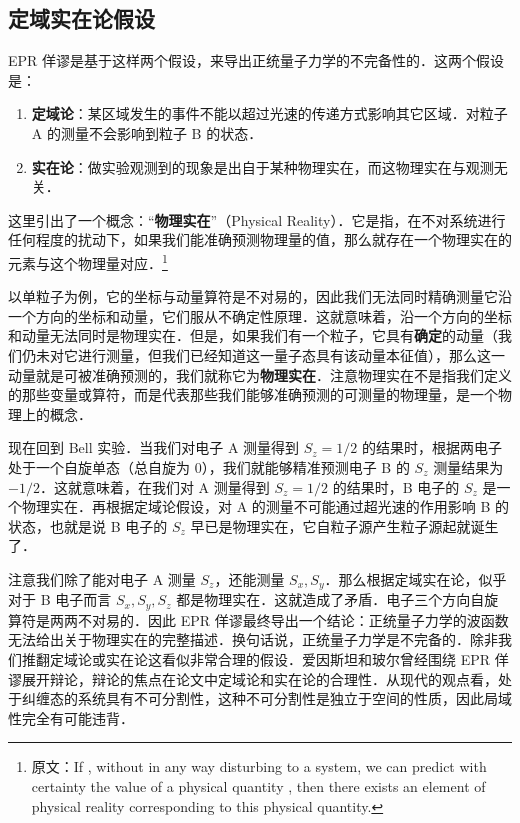 \subsection{定域实在论假设}
EPR 佯谬是基于这样两个假设，来导出正统量子力学的不完备性的．这两个假设是：
\begin{enumerate}
\item \textbf{定域论}：某区域发生的事件不能以超过光速的传递方式影响其它区域．对粒子 A 的测量不会影响到粒子 B 的状态．
\item \textbf{实在论}：做实验观测到的现象是出自于某种物理实在，而这物理实在与观测无关．
\end{enumerate}
这里引出了一个概念：“\textbf{物理实在}”（Physical Reality）．它是指，在不对系统进行任何程度的扰动下，如果我们能准确预测物理量的值，那么就存在一个物理实在的元素与这个物理量对应．\footnote{原文：If , without in any way disturbing to a system, we can predict with certainty the value of a physical quantity , then there exists an element of physical reality corresponding to this physical quantity. }

以单粒子为例，它的坐标与动量算符是不对易的，因此我们无法同时精确测量它沿一个方向的坐标和动量，它们服从不确定性原理．这就意味着，沿一个方向的坐标和动量无法同时是物理实在．但是，如果我们有一个粒子，它具有\textbf{确定}的动量（我们仍未对它进行测量，但我们已经知道这一量子态具有该动量本征值），那么这一动量就是可被准确预测的，我们就称它为\textbf{物理实在}．注意物理实在不是指我们定义的那些变量或算符，而是代表那些我们能够准确预测的可测量的物理量，是一个物理上的概念．

现在回到 Bell 实验．当我们对电子 A 测量得到 $S_z=1/2$ 的结果时，根据两电子处于一个自旋单态（总自旋为 $0$），我们就能够精准预测电子 B 的 $S_z$ 测量结果为 $-1/2$．这就意味着，在我们对 A 测量得到 $S_z=1/2$ 的结果时，B 电子的 $S_z$ 是一个物理实在．再根据定域论假设，对 A 的测量不可能通过超光速的作用影响 B 的状态，也就是说 B 电子的 $S_z$ 早已是物理实在，它自粒子源产生粒子源起就诞生了．

注意我们除了能对电子 A 测量 $S_z$，还能测量 $S_x,S_y$．那么根据定域实在论，似乎对于 B 电子而言 $S_x,S_y,S_z$ 都是物理实在．这就造成了矛盾．电子三个方向自旋算符是两两不对易的．因此 EPR 佯谬最终导出一个结论：正统量子力学的波函数无法给出关于物理实在的完整描述．换句话说，正统量子力学是不完备的．除非我们推翻定域论或实在论这看似非常合理的假设．爱因斯坦和玻尔曾经围绕 EPR 佯谬展开辩论，辩论的焦点在论文中定域论和实在论的合理性．从现代的观点看，处于纠缠态的系统具有不可分割性，这种不可分割性是独立于空间的性质，因此局域性完全有可能违背．

